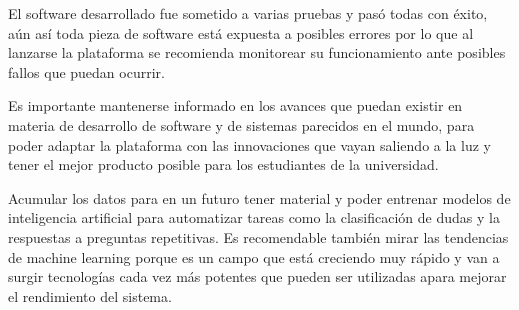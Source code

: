 \begin{recomendations}
    El software desarrollado fue sometido a varias pruebas y pasó todas con éxito, aún así toda pieza de software está expuesta a posibles errores por lo que al lanzarse la plataforma se recomienda monitorear su funcionamiento ante posibles fallos que puedan ocurrir.
    \newline
    
    Es importante mantenerse informado en los avances que puedan existir en materia de desarrollo de software y de sistemas parecidos en el mundo, para poder adaptar la plataforma con las innovaciones que vayan saliendo a la luz y tener el mejor producto posible para los estudiantes de la universidad.
    \newline
    
    Acumular los datos para en un futuro tener material y poder entrenar modelos de inteligencia artificial para automatizar tareas como la clasificación de dudas y la respuestas a preguntas repetitivas. Es recomendable también mirar las tendencias de machine learning porque es un campo que está creciendo muy rápido y van a surgir tecnologías cada vez más potentes que pueden ser utilizadas apara mejorar el rendimiento del sistema.
\end{recomendations}
